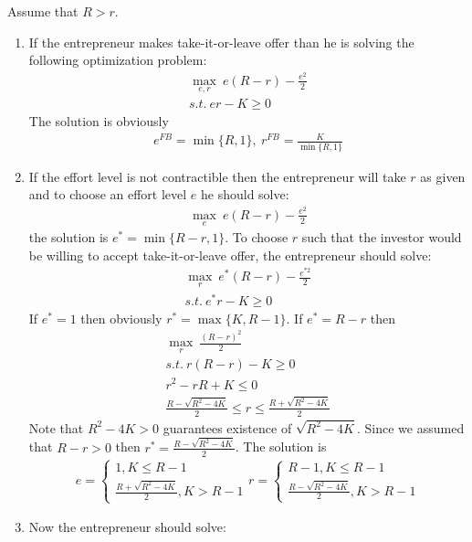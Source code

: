 \documentclass[a4paper]{article}
\begin{document}
Assume that $R > r$.
\begin{enumerate}
	\item If the entrepreneur makes take-it-or-leave offer than he is solving the following optimization problem:
	\begin{align*}
	\underset{e, r}{\max}\ e(R - r) - \frac{e^2}{2}\\
	s.t.\ er - K \ge 0
	\end{align*}
	The solution is obviously
	\begin{align*}
	e^{FB} = \min\{R, 1\},\ r^{FB} = \frac{K}{\min\{R, 1\}}
	\end{align*}
	\item If the effort level is not contractible then the entrepreneur will take $r$ as given and to choose an effort level $e$ he should solve:
	\begin{align*}
	\underset{e}{\max}\ e(R - r) - \frac{e^2}{2}
	\end{align*}
	the solution is $e^* = \min\{R - r, 1\}$. To choose $r$ such that the investor would be willing to accept take-it-or-leave offer, the entrepreneur should solve:
	\begin{align*}
	\underset{r}{\max}\ e^*(R-r) - \frac{e^{*2}}{2}\\
	s.t.\ e^*r - K \ge 0
	\end{align*}
	If $e^* = 1$ then obviously $r^* = \max\{K, R-1\}$. If $e^* = R - r$ then
	\begin{align*}
	\underset{r}{\max}\ \frac{(R - r)^2}{2}\\
	s.t.\ r(R - r) - K \ge 0\\
	r^2 - rR + K \le 0\\
	\frac{R - \sqrt{R^2 - 4K}}{2} \le r \le \frac{R + \sqrt{R^2 - 4K}}{2}
	\end{align*}
	Note that $R^2 - 4K > 0$ guarantees existence of $\sqrt{R^2 - 4K}$. Since we assumed that $R - r > 0$ then $r^* = \frac{R - \sqrt{R^2 - 4K}}{2}$. The solution is
	\begin{align*}
	e = \begin{cases}
	1, K \le R - 1\\
	\frac{R + \sqrt{R^2 - 4K}}{2}, K > R - 1
	\end{cases} r = \begin{cases}
	R - 1, K \le R - 1\\
	\frac{R - \sqrt{R^2 - 4K}}{2}, K > R - 1
	\end{cases}
	\end{align*}
	\item Now the entrepreneur should solve:

\end{enumerate}
\end{document}
